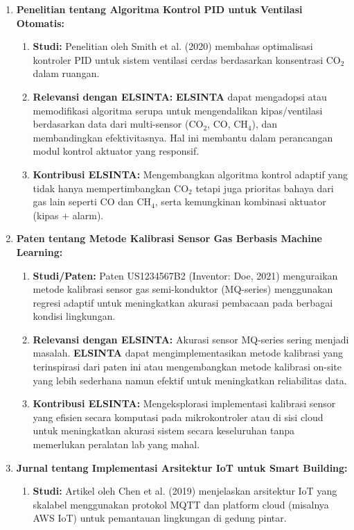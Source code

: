 \documentclass{elsinta}
\begin{document}
\begin{enumerate}
    \item \textbf{Penelitian tentang Algoritma Kontrol PID untuk Ventilasi Otomatis:}
    \begin{enumerate}
        \item \textbf{Studi:} Penelitian oleh Smith et al. (2020) membahas optimalisasi kontroler PID untuk sistem ventilasi cerdas berdasarkan konsentrasi CO$_2$ dalam ruangan.
        \item \textbf{Relevansi dengan  ELSINTA:} \textbf{ ELSINTA} dapat mengadopsi atau memodifikasi algoritma serupa untuk mengendalikan kipas/ventilasi berdasarkan data dari multi-sensor (CO$_2$, CO, CH$_4$), dan membandingkan efektivitasnya. Hal ini membantu dalam perancangan modul kontrol aktuator yang responsif.
        \item \textbf{Kontribusi  ELSINTA:} Mengembangkan algoritma kontrol adaptif yang tidak hanya mempertimbangkan CO$_2$ tetapi juga prioritas bahaya dari gas lain seperti CO dan CH$_4$, serta kemungkinan kombinasi aktuator (kipas + alarm).
    \end{enumerate}
    \item \textbf{Paten tentang Metode Kalibrasi Sensor Gas Berbasis Machine Learning:}
    \begin{enumerate}
        \item \textbf{Studi/Paten:} Paten US1234567B2 (Inventor: Doe, 2021) menguraikan metode kalibrasi sensor gas semi-konduktor (MQ-series) menggunakan regresi adaptif untuk meningkatkan akurasi pembacaan pada berbagai kondisi lingkungan.
        \item \textbf{Relevansi dengan  ELSINTA:} Akurasi sensor MQ-series sering menjadi masalah. \textbf{ ELSINTA} dapat mengimplementasikan metode kalibrasi yang terinspirasi dari paten ini atau mengembangkan metode kalibrasi on-site yang lebih sederhana namun efektif untuk meningkatkan reliabilitas data.
        \item \textbf{Kontribusi  ELSINTA:} Mengeksplorasi implementasi kalibrasi sensor yang efisien secara komputasi pada mikrokontroler atau di sisi cloud untuk meningkatkan akurasi sistem secara keseluruhan tanpa memerlukan peralatan lab yang mahal.
    \end{enumerate}
    \item \textbf{Jurnal tentang Implementasi Arsitektur IoT untuk Smart Building:}
    \begin{enumerate}
        \item \textbf{Studi:} Artikel oleh Chen et al. (2019) menjelaskan arsitektur IoT yang skalabel menggunakan protokol MQTT dan platform cloud (misalnya AWS IoT) untuk pemantauan lingkungan di gedung pintar.

\end{enumerate}
\end{enumerate}
\end{document}
